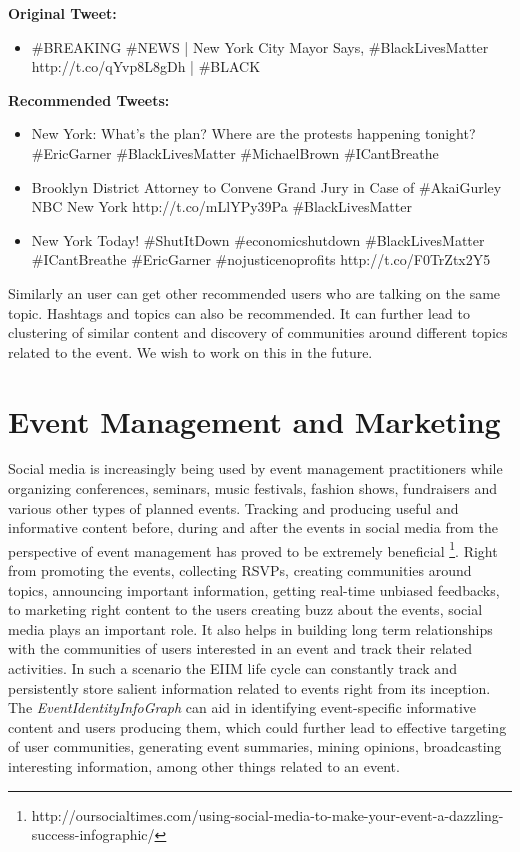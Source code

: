 \textbf{Original Tweet:}

\begin{itemize}
\item \#BREAKING \#NEWS | New York City Mayor Says, \#BlackLivesMatter \\ http://t.co/qYvp8L8gDh | \#BLACK  
\end{itemize}

\textbf{Recommended Tweets:}

\begin{itemize}

\item New York: What's the plan? Where are the protests happening tonight? \#EricGarner \#BlackLivesMatter \#MichaelBrown \#ICantBreathe

\item Brooklyn District Attorney to Convene Grand Jury in Case of \#AkaiGurley NBC New York http://t.co/mLlYPy39Pa \#BlackLivesMatter

\item New York Today! \#ShutItDown \#economicshutdown \#BlackLivesMatter \#ICantBreathe \#EricGarner \#nojusticenoprofits http://t.co/F0TrZtx2Y5

\end{itemize}

Similarly an user can get other recommended users who are talking on the same topic. Hashtags and topics can also be recommended. It can further lead to clustering of similar content and discovery of communities around different topics related to the event. We wish to work on this in the future.



\section{Event Management and Marketing}
Social media is increasingly being used  by event management practitioners while organizing conferences, seminars, music festivals, fashion shows, fundraisers and various other types of planned events. Tracking and producing useful and informative content before, during and after the events in social media from the perspective of event management has proved to be extremely beneficial \footnote{http://oursocialtimes.com/using-social-media-to-make-your-event-a-dazzling-success-infographic/}. Right from promoting the events, collecting RSVPs, creating communities around topics, announcing important information, getting real-time unbiased feedbacks, to marketing right content to the users creating buzz about the events, social media plays an important role. It also helps in building long term relationships with the communities of users interested in an event and track their related activities. In such a scenario the EIIM life cycle can constantly track and persistently store salient information related to events right from its inception. The \textit{EventIdentityInfoGraph} can aid in identifying event-specific informative content and users producing them, which could further lead to effective targeting of user communities, generating event summaries, mining opinions, broadcasting interesting information, among other things related to an event.


